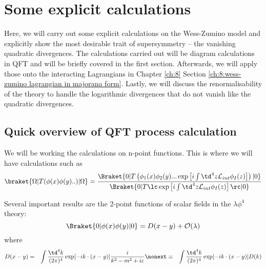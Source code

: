 \chapter{Some explicit calculations}
\label{ch:9}

Here, we will carry out some explicit calculations on the Wess-Zumino model and explicitly show the most desirable trait of supersymmetry -- the vanishing quadratic divergences. The calculations carried out will be diagram calculations in QFT and will be briefly covered in the first section. Afterwards, we will apply those onto the interacting Lagrangians in Chapter \ref{ch:8} Section \ref{ch:8:wess-zumino lagrangian in majorana form}. Lastly, we will discuss the renormalisability of the theory to handle the logarithmic divergences that do not vanish like the quadratic divergences. 

\section{Quick overview of QFT process calculation}
\label{ch:9:quick overview of qft process calculation}
We will be working the calculations on n-point functions. This is where we will have calculations such as
\begin{equation}
    \braket{\Omega|T(\phi(x)\phi(y)..)|\Omega} = \frac{\Braket{0|T\left(\phi_1(x)\phi_2(y)...\exp\left[i\int\td^4z \mathcal{L}_{int}\phi_I(z)\right]\right)|0}}{\Braket{0|T\lc\exp\left[i\int\td^4z \mathcal{L}_{int}\phi_I(z)\right]\rc|0}}
\end{equation}

Several important results are the 2-point functions of scalar fields in the $\lambda\phi^4$ theory:
\begin{equation}
    \Braket{0|\phi(x)\phi(y)|0} = D(x-y) + \mathcal{O}(\lambda)
\end{equation}
where
\begin{eqnarray}
    D(x-y) &=& \int \frac{\td^4 k}{(2\pi)^4} \exp[-ik\cdot(x-y)] \frac{i}{k^2 - m^2 + i\varepsilon} \nonext
    &\equiv& \int \frac{\td^4 k}{(2\pi)^4} \exp[-ik\cdot(x-y)] D(k)
\end{eqnarray}

